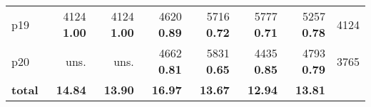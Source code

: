 \begin{tabular}{lrrrrrrr}
\multicolumn{1}{l|}{p19} & {\footnotesize 4124} \textbf{1.00} & {\footnotesize 4124} \textbf{1.00} & {\footnotesize 4620} \textbf{0.89} & {\footnotesize 5716} \textbf{0.72} & {\footnotesize 5777} \textbf{0.71} & {\footnotesize 5257} \textbf{0.78} & \multicolumn{1}{|r}{4124}\\
\multicolumn{1}{l|}{p20} & uns. & uns. & {\footnotesize 4662} \textbf{0.81} & {\footnotesize 5831} \textbf{0.65} & {\footnotesize 4435} \textbf{0.85} & {\footnotesize 4793} \textbf{0.79} & \multicolumn{1}{|r}{3765}\\
\midrule
\textbf{total} & \textbf{14.84} & \textbf{13.90} & \textbf{16.97} & \textbf{13.67} & \textbf{12.94} & \textbf{13.81} & \\
\bottomrule
\end{tabular}

